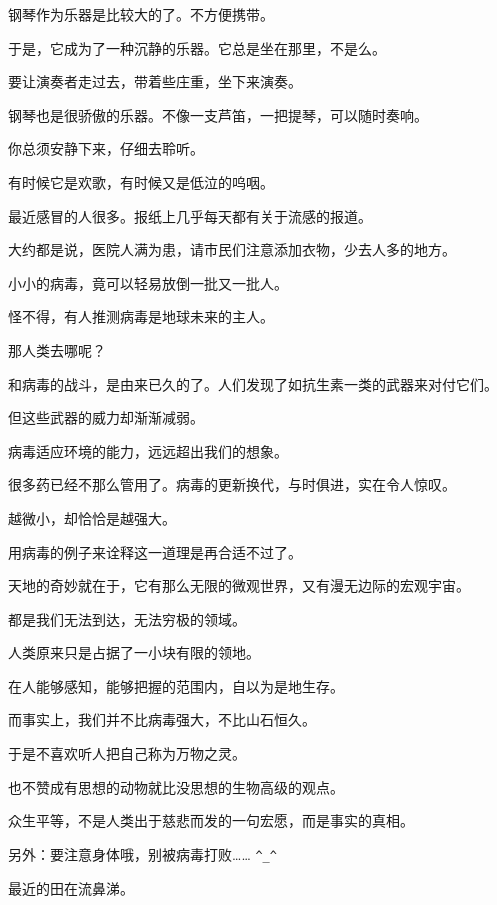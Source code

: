 		\vspace{1em}
		钢琴作为乐器是比较大的了。不方便携带。\par
		于是，它成为了一种沉静的乐器。它总是坐在那里，不是么。\par
		要让演奏者走过去，带着些庄重，坐下来演奏。\par
		钢琴也是很骄傲的乐器。不像一支芦笛，一把提琴，可以随时奏响。\par
		你总须安静下来，仔细去聆听。\par
		有时候它是欢歌，有时候又是低泣的呜咽。

	\endwriting



		最近感冒的人很多。报纸上几乎每天都有关于流感的报道。\par
		大约都是说，医院人满为患，请市民们注意添加衣物，少去人多的地方。\par
		小小的病毒，竟可以轻易放倒一批又一批人。\par
		怪不得，有人推测病毒是地球未来的主人。\par
		那人类去哪呢？\par
		和病毒的战斗，是由来已久的了。人们发现了如抗生素一类的武器来对付它们。\par
		但这些武器的威力却渐渐减弱。\par
		病毒适应环境的能力，远远超出我们的想象。\par
		很多药已经不那么管用了。病毒的更新换代，与时俱进，实在令人惊叹。\par
		越微小，却恰恰是越强大。\par
		用病毒的例子来诠释这一道理是再合适不过了。\par
		天地的奇妙就在于，它有那么无限的微观世界，又有漫无边际的宏观宇宙。\par
		都是我们无法到达，无法穷极的领域。\par
		人类原来只是占据了一小块有限的领地。\par
		在人能够感知，能够把握的范围内，自以为是地生存。\par
		而事实上，我们并不比病毒强大，不比山石恒久。\par
		于是不喜欢听人把自己称为万物之灵。\par
		也不赞成有思想的动物就比没思想的生物高级的观点。\par
		众生平等，不是人类出于慈悲而发的一句宏愿，而是事实的真相。

		另外：要注意身体哦，别被病毒打败…… \verb|^_^|\par
		最近的田在流鼻涕。

